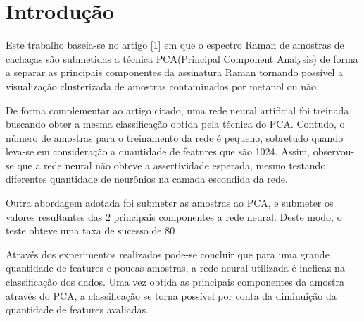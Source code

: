 \documentclass{article}
\begin{document}
\pagestyle{empty} 
\sloppy
{}

\begin{abstract}
O presente trabalho valida a utilização de redes neurais artificiais na interpretação de dados do espectro Raman de amostras de cachaça. Combinando a modelagem a técnica PCA(Principal Component Analysis) de forma a maximizar a taxa de sucesso obtida. \vspace{2cm}
\end{abstract}

\section{Introdução}
\vspace{1cm} 
Este trabalho baseia-se no artigo [1] em que o espectro Raman de amostras de cachaças são submetidas a técnica PCA(Principal Component Analysis) de forma a separar as principais componentes da assinatura Raman tornando possível a visualização clusterizada de amostras contaminados por metanol ou não.

De forma complementar ao artigo citado, uma rede neural artificial foi treinada buscando obter a mesma classificação obtida pela técnica do PCA. Contudo, o número de amostras para o treinamento da rede é pequeno, sobretudo quando leva-se em consideração a quantidade de features que são 1024. Assim, observou-se que a rede neural não obteve a assertividade esperada, mesmo testando diferentes quantidade de neurônios na camada escondida da rede.

Outra abordagem adotada foi submeter as amostras ao PCA, e submeter os valores resultantes das 2 principais componentes a rede neural. Deste modo, o teste obteve uma taxa de sucesso de 80%

Através dos experimentos realizados pode-se concluir que para uma grande quantidade de features e poucas amostras, a rede neural utilizada é ineficaz na classificação dos dados. Uma vez obtida as principais componentes da amostra através do PCA, a classificação se torna possível por conta da diminuição da quantidade de features avaliadas.
\end{document}
